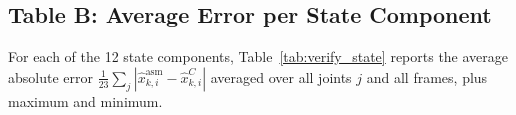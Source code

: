 \documentclass[12pt,a4paper]{article}
\begin{document}
\subsection{Table B: Average Error per State Component}

\noindent
For each of the 12 state components, Table~\ref{tab:verify_state}
reports the average absolute error $\frac{1}{23}\sum_{j}
|\hat{x}^{\text{asm}}_{k,i} - \hat{x}^{C}_{k,i}|$ averaged over all
joints $j$ and all frames, plus maximum and minimum.

\begin{table}[H]
\centering
\caption{Table~B — Average error per state component (averaged over all 23 joints and all frames).
         Tolerance $\varepsilon_{\text{tol}} = 10^{-9}$.
         Populate from \texttt{verification\_table.csv} column \texttt{avg\_err}.}
\label{tab:verify_state}
\end{table}
\end{document}
